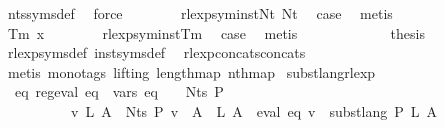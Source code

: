 \begin{isabellebody}
\ nts{\isacharunderscore}{\kern0pt}syms{\isacharunderscore}{\kern0pt}def\ \isamarkupfalse%
\ force\isanewline
\ \ \ \ \ \ \isamarkupfalse%
\ rlexp{\isacharunderscore}{\kern0pt}sym{\isacharunderscore}{\kern0pt}inst{\isacharunderscore}{\kern0pt}Nt\ Nt\ \isamarkupfalse%
\ {\isacharquery}{\kern0pt}case\ \isamarkupfalse%
\ metis\isanewline
\ \ \ \ \isamarkupfalse%
\isanewline
\ \ \ \ \ \ \isamarkupfalse%
\ {\isacharparenleft}{\kern0pt}Tm\ x{\isacharparenright}{\kern0pt}\isanewline
\ \ \ \ \ \ \isamarkupfalse%
\ rlexp{\isacharunderscore}{\kern0pt}sym{\isacharunderscore}{\kern0pt}inst{\isacharunderscore}{\kern0pt}Tm\ \isamarkupfalse%
\ {\isacharquery}{\kern0pt}case\ \isamarkupfalse%
\ metis\isanewline
\ \ \ \ \isamarkupfalse%
\isanewline
\ \ \isamarkupfalse%
\isanewline
\ \ \isamarkupfalse%
\ \isamarkupfalse%
\ {\isacharquery}{\kern0pt}thesis\ \isamarkupfalse%
\ rlexp{\isacharunderscore}{\kern0pt}syms{\isacharunderscore}{\kern0pt}def\ inst{\isacharunderscore}{\kern0pt}syms{\isacharunderscore}{\kern0pt}def\ \isamarkupfalse%
\ rlexp{\isacharunderscore}{\kern0pt}concats{\isacharunderscore}{\kern0pt}concats\isanewline
\ \ \ \ \isamarkupfalse%
\ {\isacharparenleft}{\kern0pt}metis\ {\isacharparenleft}{\kern0pt}mono{\isacharunderscore}{\kern0pt}tags{\isacharcomma}{\kern0pt}\ lifting{\isacharparenright}{\kern0pt}\ length{\isacharunderscore}{\kern0pt}map\ nth{\isacharunderscore}{\kern0pt}map{\isacharparenright}{\kern0pt}\isanewline
{}\isamarkupfalse%
%
\endisatagproof
{\isafoldproof}%
%
\isadelimproof
\isanewline
%
\endisadelimproof
\isanewline
\isanewline
{}\isamarkupfalse%
\ subst{\isacharunderscore}{\kern0pt}lang{\isacharunderscore}{\kern0pt}rlexp{\isacharcolon}{\kern0pt}\isanewline
\ \ {\isachardoublequoteopen}{\isasymexists}eq{\isachardot}{\kern0pt}\ reg{\isacharunderscore}{\kern0pt}eval\ eq\ {\isasymand}\ vars\ eq\ {\isasymsubseteq}\ {\isasymgamma}{\isacharprime}{\kern0pt}\ {\isacharbackquote}{\kern0pt}\ Nts\ P\isanewline
\ \ \ \ \ \ \ \ \ {\isasymand}\ {\isacharparenleft}{\kern0pt}{\isasymforall}v\ L{\isachardot}{\kern0pt}\ {\isacharparenleft}{\kern0pt}{\isasymforall}A\ {\isasymin}\ Nts\ P{\isachardot}{\kern0pt}\ v\ {\isacharparenleft}{\kern0pt}{\isasymgamma}{\isacharprime}{\kern0pt}\ A{\isacharparenright}{\kern0pt}\ {\isacharequal}{\kern0pt}\ L\ A{\isacharparenright}{\kern0pt}\ {\isasymlongrightarrow}\ eval\ eq\ v\ {\isacharequal}{\kern0pt}\ subst{\isacharunderscore}{\kern0pt}lang\ P\ L\ A{\isacharparenright}{\kern0pt}{\isachardoublequoteclose}\isanewline

\end{isabellebody}
